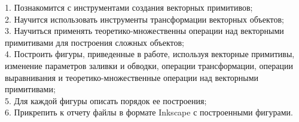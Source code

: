 1. Познакомится с инструментами создания векторных примитивов;\\


2. Научится использовать инструменты трансформации векторных объектов;\\


3. Научиться применять теоретико-множественны операции над векторными примитивами
для построения сложных объектов;\\


4. Построить фигуры, приведенные в работе, используя векторные примитивы, 
изменение параметров заливки и обводки, операции трансформации, операции
выравнивания и теоретико-множественные операции над векторными примитивами;\\


5. Для каждой фигуры описать порядок ее построения;\\


6. Прикрепить к отчету файлы в формате Inkscape с построенными фигурами.

